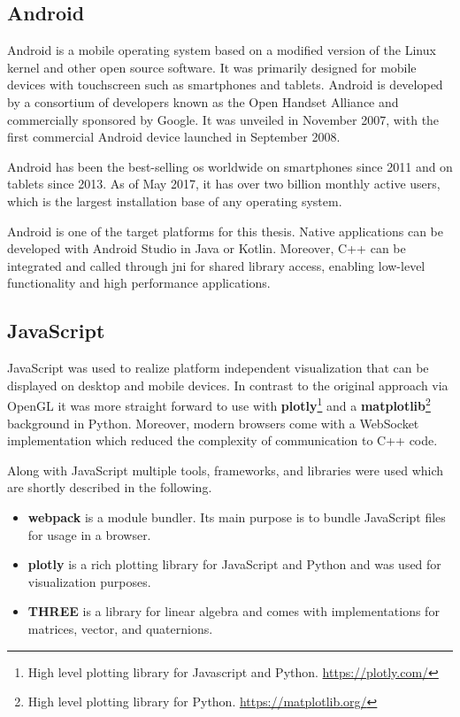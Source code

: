 \subsection{Android}

Android is a mobile operating system based on a modified version of the Linux kernel and other open source software. It was primarily designed for mobile devices with touchscreen such as smartphones and tablets. Android is developed by a consortium of developers known as the Open Handset Alliance and commercially sponsored by Google. It was unveiled in November 2007, with the first commercial Android device launched in September 2008.

Android has been the best-selling \gls{os} worldwide on smartphones since 2011 and on tablets since 2013. As of May 2017, it has over two billion monthly active users, which is the largest installation base of any operating system.

Android is one of the target platforms for this thesis. Native applications can be developed with Android Studio in Java or Kotlin. Moreover, C++ can be integrated and called through \gls{jni} for shared library access, enabling low-level functionality and high performance applications.

\subsection{JavaScript}

JavaScript was used to realize platform independent visualization that can be displayed on desktop and mobile devices. In contrast to the original approach via OpenGL it was more straight forward to use with \textbf{plotly}\footnote{High level plotting library for Javascript and Python. \url{https://plotly.com/}} and a \textbf{matplotlib}\footnote{High level plotting library for Python. \url{https://matplotlib.org/}} background in Python. Moreover, modern browsers come with a WebSocket implementation which reduced the complexity of communication to C++ code.

Along with JavaScript multiple tools, frameworks, and libraries were used which are shortly described in the following.

\begin{itemize}
  \item \textbf{webpack} is a module bundler. Its main purpose is to bundle JavaScript files for usage in a browser.
  \item \textbf{plotly} is a rich plotting library for JavaScript and Python and was used for visualization purposes.
  \item \textbf{THREE} is a library for linear algebra and comes with implementations for matrices, vector, and quaternions.
\end{itemize}

